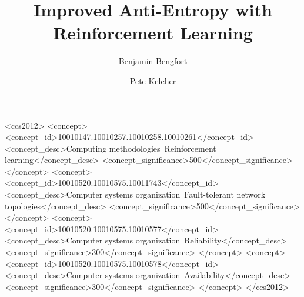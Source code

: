 \documentclass[sigconf]{acmart}
\begin{document}
\title{Improved Anti-Entropy with Reinforcement Learning}


\author{Benjamin Bengfort}

\author{Pete Keleher}


\begin{abstract}
    
\end{abstract}

%
%
\begin{CCSXML}
<ccs2012>
<concept>
<concept_id>10010147.10010257.10010258.10010261</concept_id>
<concept_desc>Computing methodologies~Reinforcement learning</concept_desc>
<concept_significance>500</concept_significance>
</concept>
<concept>
<concept_id>10010520.10010575.10011743</concept_id>
<concept_desc>Computer systems organization~Fault-tolerant network topologies</concept_desc>
<concept_significance>500</concept_significance>
</concept>
<concept>
<concept_id>10010520.10010575.10010577</concept_id>
<concept_desc>Computer systems organization~Reliability</concept_desc>
<concept_significance>300</concept_significance>
</concept>
<concept>
<concept_id>10010520.10010575.10010578</concept_id>
<concept_desc>Computer systems organization~Availability</concept_desc>
<concept_significance>300</concept_significance>
</concept>
</ccs2012>
\end{CCSXML}





\maketitle





\end{document}

